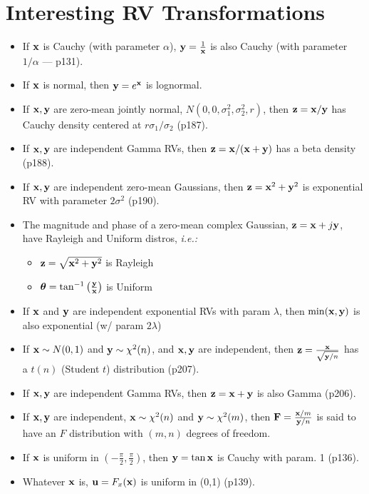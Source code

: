 \documentclass[a4paper, oneside]{book}
\begin{document}
\section{Interesting RV Transformations}
\begin{itemize}
\item If $\mathbf x$ is Cauchy (with parameter $\alpha$), $\mathbf y = \frac{1}{\mathbf x}$ is also Cauchy (with parameter $1/\alpha$ \---- p131).
\item If $\mathbf x$ is normal, then $\mathbf y = e^{\mathbf x}$ is lognormal.
\item If $\mathbf{x, y}$ are zero-mean jointly normal, $N(0,0,\sigma_1^2, \sigma_2^2, r)$, then $\mathbf z=\mathbf{x/y}$ has Cauchy density centered at $r \sigma_1/\sigma_2$ (p187).
\item If $\mathbf{x, y}$ are independent Gamma RVs, then $\mathbf z=\mathbf{x/(x+y)}$ has a beta density (p188).
\item If $\mathbf{x, y}$ are independent zero-mean Gaussians, then $\mathbf z=\mathbf{x}^2+\mathbf{y}^2$ is exponential RV with parameter $2\sigma^2$ (p190).
\item The magnitude and phase of a zero-mean complex Gaussian, $\mathbf{z} = \mathbf{x}+j \mathbf y$, have Rayleigh and Uniform distros, \textit{i.e.:}
	\begin{itemize}
	\item $\mathbf z = \sqrt{\mathbf x^2 + \mathbf y^2}$ is Rayleigh
	\item $\boldsymbol \theta = \tan^{-1}\left(\frac{\mathbf y}{\mathbf x}\right)$ is Uniform
	\end{itemize}
\item If $\mathbf x$ and $\mathbf y$ are independent exponential RVs with param $\lambda$, then $\min(\mathbf{x,y})$ is also exponential (w/ param $2 \lambda$)
\item If $\mathbf x \sim N(0,1)$ and $\mathbf y \sim \chi^2(n)$, and $\mathbf {x,y}$ are independent, then $\mathbf z =\frac{\mathbf x}{\sqrt{\mathbf y/n}}$ has a $t(n)$ (Student $t$) distribution (p207).
\item If $\mathbf{x,y}$ are independent Gamma RVs, then $\mathbf{z=x+y}$ is also Gamma (p206).
\item If $\mathbf{x,y}$ are independent, $\mathbf x\sim \chi^2(n)$ and $\mathbf y \sim \chi^2(m)$, then $\mathbf F = \frac{\mathbf x/m}{\mathbf y/n}$ is said to have an $F$ distribution with $(m,n)$ degrees of freedom.
\item If $\mathbf x$ is uniform in $(-\frac{\pi}{2}, \frac{\pi}{2})$, then $\mathbf y = \tan \mathbf x$ is Cauchy with param. 1 (p136).
\item Whatever $\mathbf x$ is, $\mathbf u = F_x(\mathbf x)$ is uniform in (0,1) (p139).

\end{itemize}
\end{document}
